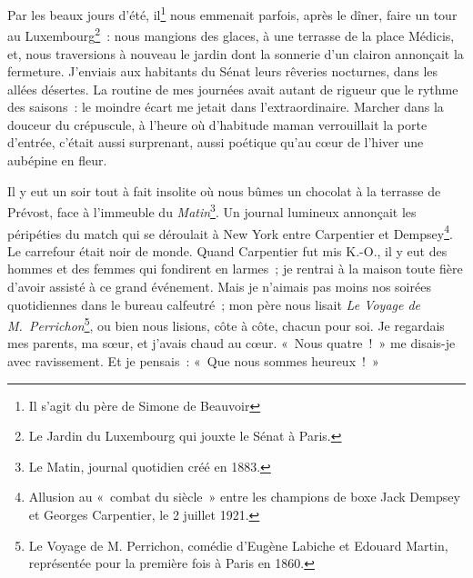 {Par les beaux jours d'été, il\footnote{Il s'agit du père de Simone de
Beauvoir} nous emmenait parfois, après le dîner, faire un tour au
Luxembourg\footnote{Le Jardin du Luxembourg qui jouxte le Sénat à
Paris.}~: nous mangions des glaces, à une terrasse de la place
Médicis, et, nous traversions à nouveau le jardin dont la sonnerie
d'un clairon annonçait la fermeture. J'enviais aux habitants du Sénat
leurs rêveries nocturnes, dans les allées désertes. La routine de mes
journées avait autant de rigueur que le rythme des saisons~: le
moindre écart me jetait dans l'extraordinaire. Marcher dans la
douceur du crépuscule, à l'heure où d'habitude maman verrouillait la
porte d'entrée, c'était aussi surprenant, aussi poétique qu'au cœur
de l'hiver une aubépine en fleur.

Il y eut un soir tout à fait insolite où nous bûmes un chocolat à la
terrasse de Prévost, face à l'immeuble du \textit{Matin}\footnote{Le
Matin, journal quotidien créé en 1883.}. Un journal lumineux
annonçait les péripéties du match qui se déroulait à New York entre
Carpentier et Dempsey\footnote{Allusion au «~combat du siècle~» entre
les champions de boxe Jack Dempsey et Georges Carpentier, le 2
juillet 1921.}. Le carrefour était noir de monde. Quand Carpentier
fut mis K.-O., il y eut des hommes et des femmes qui fondirent en
larmes~; je rentrai à la maison toute fière d'avoir assisté à ce
grand événement. Mais je n'aimais pas moins nos soirées quotidiennes
dans le bureau calfeutré~; mon père nous lisait \textit{Le Voyage de
M.~Perrichon}\footnote{Le Voyage de M. Perrichon, comédie d'Eugène
Labiche et Edouard Martin, représentée pour la première fois à Paris
en 1860.}, ou bien nous lisions, côte à côte, chacun pour soi. Je
regardais mes parents, ma sœur, et j'avais chaud au cœur. «~Nous
quatre~!~» me disais-je avec ravissement. Et je pensais~: «~Que nous
sommes heureux~!~»

}
